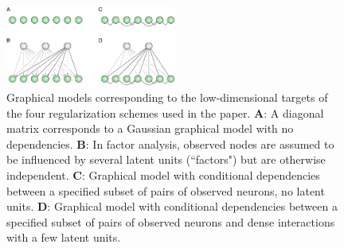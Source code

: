 \begin{figure}[htp]
\centering
\includegraphics[width=0.5\textwidth]{figures/Figure2.pdf}
\caption{
Graphical models corresponding to the low-dimensional targets of the four regularization schemes used in the paper.
\textbf{A}: A diagonal matrix corresponds to a Gaussian graphical model with no dependencies.
\textbf{B}: In factor analysis, observed nodes are assumed to be influenced by several latent units (``factors") but are otherwise independent.
\textbf{C}: Graphical model with conditional dependencies between a specified subset of pairs of observed neurons, no latent units. 
\textbf{D}: Graphical model with conditional dependencies between a specified subset of pairs of observed neurons and dense interactions with a few latent units.
}\label{fig:02}
\end{figure}
